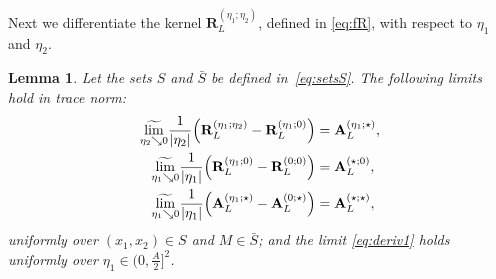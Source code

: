 \documentclass[oneside,final,11pt]{amsart}
\newtheorem{lem}[thm]{Lemma}
\theoremstyle{definition}
\newcommand{\mylim}[1]{\underset{#1}{\wt{\mathrm{lim}}}}
\newcommand{\1}[1]{\mathbf{1}_{#1}}
\newcommand{\wt}{\widetilde}
\newcommand{\fA}{\mathbf{A}}
\newcommand{\fR}{\mathbf{R}}
\numberwithin{equation}{section}
\begin{document}
Next we differentiate the kernel $\fR_L^{(\eta_1; \eta_2)}$, defined in \eqref{eq:fR}, with respect to $\eta_1$ and $\eta_2$.

\begin{lem}\label{lem:deriv1}
Let the sets $S$ and $\bar S$ be defined in~\eqref{eq:setsS}. The following limits hold in trace norm:
\begin{subequations}\label{eqs:derivs}
\begin{align}\label{eq:deriv1}
\mylim{\eta_2 \searrow 0} \frac{1}{|\eta_2|} \Bigl( \fR_L^{(\eta_1; \eta_2)} -  \fR_L^{(\eta_1; 0)}\Bigr) &= \fA_L^{(\eta_1; \star)},\\
\mylim{\eta_1 \searrow 0} \frac{1}{|\eta_1|} \Bigl( \fR_L^{(\eta_1; 0)} -  \fR_L^{(0; 0)}\Bigr)  &= \fA_L^{(\star; 0)}, \label{eq:deriv2}\\
\mylim{\eta_1 \searrow 0} \frac{1}{|\eta_1|} \Bigl( \fA_L^{(\eta_1; \star)} -  \fA_L^{(0; \star)}\Bigr) &= \fA_L^{(\star; \star)},\label{eq:deriv3}
\end{align}
\end{subequations}
 uniformly over $(x_1, x_2) \in S$ and $M \in \bar S$; and the limit \eqref{eq:deriv1} holds uniformly over $\eta_1 \in (0, \frac{A}{2}]^2$.
\end{lem}
\end{document}
